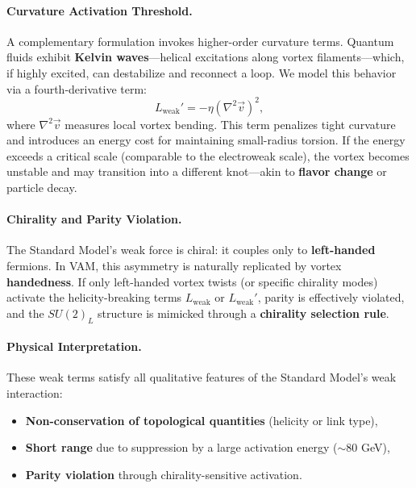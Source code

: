 \vspace{0.5em}
\paragraph{Curvature Activation Threshold.}
A complementary formulation invokes higher-order curvature terms. Quantum fluids exhibit \textbf{Kelvin waves}—helical excitations along vortex filaments—which, if highly excited, can destabilize and reconnect a loop. We model this behavior via a fourth-derivative term:
\begin{equation}
    L_{\text{weak}}' = -\eta \left( \nabla^2 \vec{v} \right)^2,
    \label{eq:kelvin-wave-term}
\end{equation}
where \( \nabla^2 \vec{v} \) measures local vortex bending. This term penalizes tight curvature and introduces an energy cost for maintaining small-radius torsion. If the energy exceeds a critical scale (comparable to the electroweak scale), the vortex becomes unstable and may transition into a different knot—akin to \textbf{flavor change} or particle decay.

\vspace{0.5em}
\paragraph{Chirality and Parity Violation.}
The Standard Model’s weak force is chiral: it couples only to \textbf{left-handed} fermions. In VAM, this asymmetry is naturally replicated by vortex \textbf{handedness}. If only left-handed vortex twists (or specific chirality modes) activate the helicity-breaking terms \( L_{\text{weak}} \) or \( L_{\text{weak}}' \), parity is effectively violated, and the \( SU(2)_L \) structure is mimicked through a \textbf{chirality selection rule}.

\vspace{0.5em}
\paragraph{Physical Interpretation.}
These weak terms satisfy all qualitative features of the Standard Model’s weak interaction:
\begin{itemize}
    \item \textbf{Non-conservation of topological quantities} (helicity or link type),
    \item \textbf{Short range} due to suppression by a large activation energy (\( \sim 80 \) GeV),
    \item \textbf{Parity violation} through chirality-sensitive activation.
\end{itemize}


